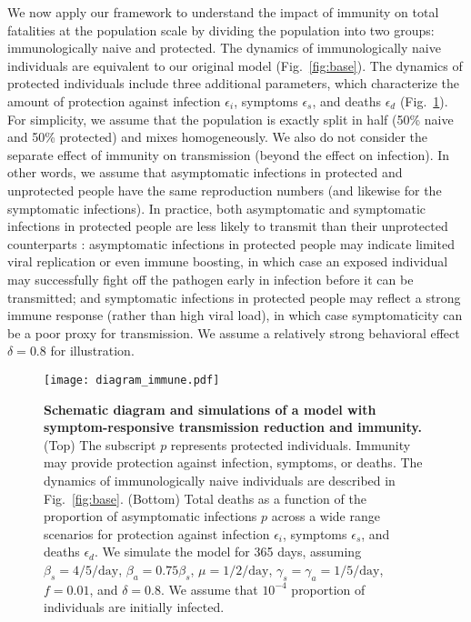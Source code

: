 \documentclass[12pt]{article}
\newcommand{\fref}[1]{Fig.~\ref{fig:#1}}
\begin{document}
We now apply our framework to understand the impact of immunity on total fatalities at the population scale by dividing the population into two groups: immunologically naive and protected.
The dynamics of immunologically naive individuals are equivalent to our original model (\fref{base}).
The dynamics of protected individuals include three additional parameters, which characterize the amount of protection against infection $\epsilon_i$, symptoms $\epsilon_s$, and deaths $\epsilon_d$ (\fref{immune}).
For simplicity, we assume that the population is exactly split in half (50\% naive and 50\% protected) and mixes homogeneously. We also do not consider the separate effect of immunity on transmission (beyond the effect on infection). 
In other words, we assume that asymptomatic infections in protected and unprotected people have the same reproduction numbers (and likewise for the symptomatic infections).
In practice, both asymptomatic and symptomatic infections in protected people are less likely to transmit than their unprotected counterparts \citep{lipsitch2020understanding}: asymptomatic infections in protected people may indicate limited viral replication or even immune boosting, in which case an exposed individual may successfully fight off the pathogen early in infection before it can be transmitted; and symptomatic infections in protected people may reflect a strong immune response (rather than high viral load), in which case symptomaticity can be a poor proxy for transmission.
We assume a relatively strong behavioral effect $\delta=0.8$ for illustration.

\begin{figure}[!ht]
\texttt{[image: diagram\_immune.pdf]}
\caption{
\textbf{Schematic diagram and simulations of a model with symptom-responsive transmission reduction and immunity.}
(Top) The subscript $p$ represents protected individuals. 
Immunity may provide protection against infection, symptoms, or deaths.
The dynamics of immunologically naive individuals are described in \fref{base}.
(Bottom) Total deaths as a function of the proportion of asymptomatic infections $p$ across a wide range scenarios for protection against infection $\epsilon_i$, symptoms $\epsilon_s$, and deaths $\epsilon_d$.
We simulate the model for 365 days, assuming $\beta_s = 4/5/\mathrm{day}$, $\beta_a = 0.75 \beta_s$, $\mu=1/2/\mathrm{day}$, $\gamma_s=\gamma_a=1/5/\mathrm{day}$, $f=0.01$, and $\delta=0.8$.
We assume that $10^{-4}$ proportion of individuals are initially infected.
}
\label{fig:immune}
\end{figure}
\end{document}
